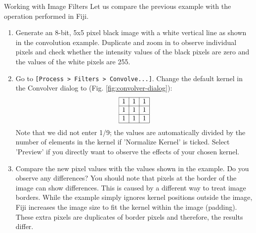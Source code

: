 \newpage
\begin{taskbox}{Working with Image Filters}
Let us compare the previous example with the operation performed in Fiji.

\begin{enumerate}
	\item Generate an 8-bit, 5x5 pixel black image with a white vertical line as shown in the convolution example. Duplicate and zoom in to observe individual pixels and check whether the intensity values of the black pixels are zero and the values of the white pixels are 255.
	\item Go to \texttt{[Process > Filters > Convolve...]}. Change the default kernel in the Convolver dialog to (Fig. \ref{fig:convolver-dialog}): 
	\[
		\begin{array}{|c|c|c|}
	\hline
	1&1&1\\
\hline
1&1&1\\
\hline
1&1&1\\
\hline
	\end{array}
\]
	Note that we did not enter 1/9; the values are automatically divided by the number of elements in the kernel if 'Normalize Kernel' is ticked. Select 'Preview' if you directly want to observe the effects of your chosen kernel.
	
	\begin{minipage}[t]{\linewidth}
		\begin{center}
		\medskip
		\label{fig:convolver-dialog}
		\end{center}
	\end{minipage}
	
	\item Compare the new pixel values with the values shown in the example. Do you observe any differences? You should note that pixels at the border of the image can show differences. This is caused by a different way to treat image borders. While the example simply ignores kernel positions outside the image, Fiji increases the image size to fit the kernel within the image (padding). These extra pixels are duplicates of border pixels and therefore, the results differ.
	
	\end{enumerate}
\end{taskbox}

